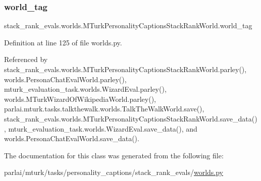 \subsubsection{\texorpdfstring{world\+\_\+tag}{world\_tag}}
{\footnotesize\ttfamily stack\+\_\+rank\+\_\+evals.\+worlds.\+M\+Turk\+Personality\+Captions\+Stack\+Rank\+World.\+world\+\_\+tag}



Definition at line 125 of file worlds.\+py.



Referenced by stack\+\_\+rank\+\_\+evals.\+worlds.\+M\+Turk\+Personality\+Captions\+Stack\+Rank\+World.\+parley(), worlds.\+Persona\+Chat\+Eval\+World.\+parley(), mturk\+\_\+evaluation\+\_\+task.\+worlds.\+Wizard\+Eval.\+parley(), worlds.\+M\+Turk\+Wizard\+Of\+Wikipedia\+World.\+parley(), parlai.\+mturk.\+tasks.\+talkthewalk.\+worlds.\+Talk\+The\+Walk\+World.\+save(), stack\+\_\+rank\+\_\+evals.\+worlds.\+M\+Turk\+Personality\+Captions\+Stack\+Rank\+World.\+save\+\_\+data(), mturk\+\_\+evaluation\+\_\+task.\+worlds.\+Wizard\+Eval.\+save\+\_\+data(), and worlds.\+Persona\+Chat\+Eval\+World.\+save\+\_\+data().



The documentation for this class was generated from the following file\+:\begin{DoxyCompactItemize}
\item 
parlai/mturk/tasks/personality\+\_\+captions/stack\+\_\+rank\+\_\+evals/\hyperlink{parlai_2mturk_2tasks_2personality__captions_2stack__rank__evals_2worlds_8py}{worlds.\+py}\end{DoxyCompactItemize}
